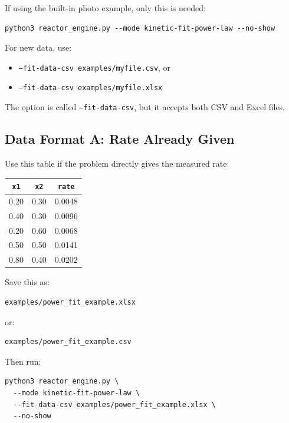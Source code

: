 \documentclass[11pt]{article}
\begin{document}
If using the built-in photo example, only this is needed:

\begin{lstlisting}
python3 reactor_engine.py --mode kinetic-fit-power-law --no-show
\end{lstlisting}

For new data, use:

\begin{itemize}
    \item \texttt{--fit-data-csv examples/myfile.csv}, or
    \item \texttt{--fit-data-csv examples/myfile.xlsx}
\end{itemize}

The option is called \texttt{--fit-data-csv}, but it accepts both CSV and Excel files.

\subsection{Data Format A: Rate Already Given}

Use this table if the problem directly gives the measured rate:

\begin{center}
\begin{tabular}{ccc}
\toprule
\texttt{x1} & \texttt{x2} & \texttt{rate} \\
\midrule
0.20 & 0.30 & 0.0048 \\
0.40 & 0.30 & 0.0096 \\
0.20 & 0.60 & 0.0068 \\
0.50 & 0.50 & 0.0141 \\
0.80 & 0.40 & 0.0202 \\
\bottomrule
\end{tabular}
\end{center}

Save this as:

\begin{lstlisting}
examples/power_fit_example.xlsx
\end{lstlisting}

or:

\begin{lstlisting}
examples/power_fit_example.csv
\end{lstlisting}

Then run:

\begin{lstlisting}
python3 reactor_engine.py \
  --mode kinetic-fit-power-law \
  --fit-data-csv examples/power_fit_example.xlsx \
  --no-show
\end{lstlisting}
\end{document}
